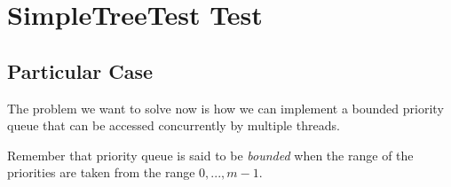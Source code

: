 \section{\textbf{SimpleTreeTest Test}}
\subsection{Particular Case}
\par
The problem we want to solve now is how we can implement a bounded priority
queue that can be accessed concurrently by multiple threads.
\par
Remember that priority queue is said to be \textit{bounded} when the range of
the priorities are taken from the range $0,...,m-1$.
\par
